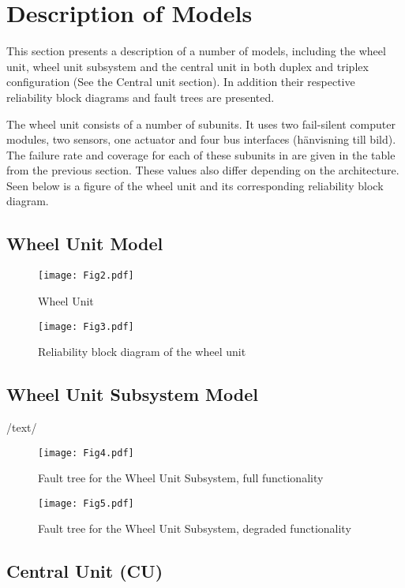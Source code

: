 \newpage
\section{Description of Models}
This section presents a description of a number of models, including the wheel unit, wheel unit subsystem and the central unit in both duplex and triplex configuration (See the Central unit section). In addition their respective reliability block diagrams and fault trees are presented.

The wheel unit consists of a number of subunits. It uses two fail-silent computer modules, two sensors, one actuator and four 
bus interfaces (hänvisning till bild). The failure rate and coverage for each of these subunits in are given in the table from the previous section. These values also differ depending on the architecture. Seen below is a figure of the wheel unit and its corresponding reliability block diagram.

\subsection{Wheel Unit Model}
\begin{figure}[H]
  \centering
  \texttt{[image: Fig2.pdf]}
  \caption{Wheel Unit}
  \label{fig2}
\end{figure}
\begin{figure}[H]
  \centering
  \texttt{[image: Fig3.pdf]}
  \caption{Reliability block diagram of the wheel unit}
  \label{fig3}
\end{figure}
\subsection{Wheel Unit Subsystem Model}
/text/
\begin{figure}[H]
  \centering
  \texttt{[image: Fig4.pdf]}
  \caption{Fault tree for the Wheel Unit Subsystem, full functionality}
  \label{fig4}
\end{figure}
\begin{figure}[H]
  \centering
  \texttt{[image: Fig5.pdf]}
  \caption{Fault tree for the Wheel Unit Subsystem, degraded functionality}
  \label{fig5}
\end{figure}
\subsection{Central Unit (CU)}
